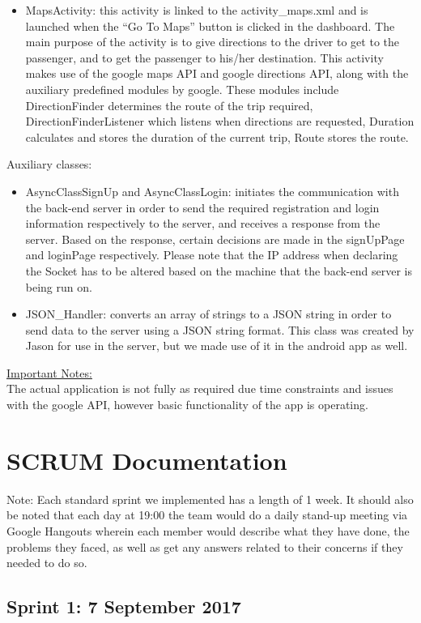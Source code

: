 \documentclass[a4paper,12pt]{article}
\begin{document}
\begin{itemize}
\item MapsActivity: this activity is linked to the activity\_maps.xml and is launched when the ``Go To
Maps'' button is clicked in the dashboard. The main purpose of the activity is to give directions
to the driver to get to the passenger, and to get the passenger to his/her destination. This
activity makes use of the google maps API and google directions API, along with the auxiliary
predefined modules by google. These modules include DirectionFinder determines the route of
the trip required, DirectionFinderListener which listens when directions are requested, Duration
calculates and stores the duration of the current trip, Route stores the route.
\end{itemize}
Auxiliary classes:
\begin{itemize}
\item AsyncClassSignUp and AsyncClassLogin: initiates the communication with the back-end server in
order to send the required registration and login information respectively to the server, and
receives a response from the server. Based on the response, certain decisions are made in the
signUpPage and loginPage respectively. Please note that the IP address when declaring the
Socket has to be altered based on the machine that the back-end server is being run on.
\item JSON\_Handler: converts an array of strings to a JSON string in order to send data to the server
using a JSON string format. This class was created by Jason for use in the server, but we made use of it in the android app as well.
\end{itemize}
\underline{Important Notes:}\\ The actual application is not fully as required due time constraints and issues with the google
API, however basic functionality of the app is operating.
\newpage
\section{SCRUM Documentation}
Note: Each standard sprint we implemented has a length of 1 week. It should also be noted that each day at 19:00 the team would do a daily stand-up meeting via Google Hangouts wherein each member would describe what they have done, the problems they faced, as well as get any answers related to their concerns if they needed to do so.
\subsection{Sprint 1: 7 September 2017}
\end{document}
